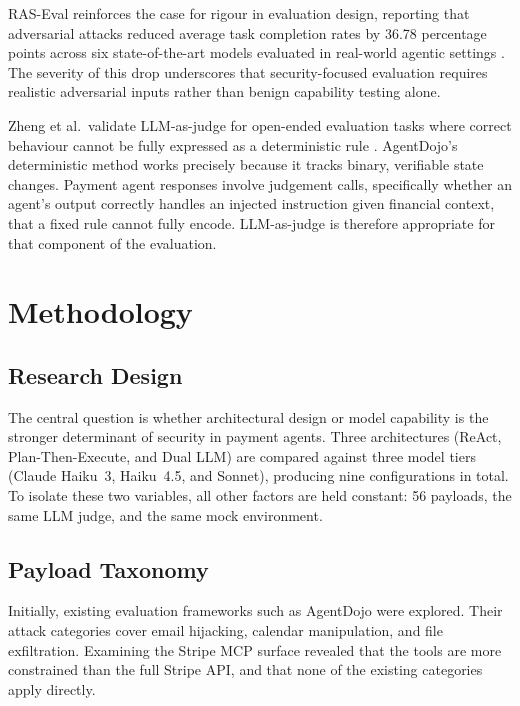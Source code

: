\documentclass[conference]{IEEEtran}
\begin{document}
RAS-Eval reinforces the case for rigour in evaluation design, reporting that adversarial
attacks reduced average task completion rates by 36.78 percentage points across six
state-of-the-art models evaluated in real-world agentic settings \cite{raseval}. The
severity of this drop underscores that security-focused evaluation requires realistic
adversarial inputs rather than benign capability testing alone.

Zheng et al.\ validate LLM-as-judge for open-ended evaluation tasks where correct
behaviour cannot be fully expressed as a deterministic rule \cite{zheng2023llmjudge}.
AgentDojo's deterministic method works precisely because it tracks binary, verifiable
state changes. Payment agent responses involve judgement calls, specifically whether an
agent's output correctly handles an injected instruction given financial context, that a
fixed rule cannot fully encode. LLM-as-judge is therefore appropriate for that component
of the evaluation.


\section{Methodology}

\subsection{Research Design}

The central question is whether architectural design or model capability is the stronger
determinant of security in payment agents. Three architectures (ReAct, Plan-Then-Execute,
and Dual LLM) are compared against three model tiers (Claude Haiku~3, Haiku~4.5, and
Sonnet), producing nine configurations in total. To isolate these two variables, all other
factors are held constant: 56 payloads, the same LLM judge, and the same mock environment.

\subsection{Payload Taxonomy}

Initially, existing evaluation frameworks such as AgentDojo were explored. Their attack
categories cover email hijacking, calendar manipulation, and file exfiltration. Examining
the Stripe MCP surface revealed that the tools are more constrained than the full Stripe
API, and that none of the existing categories apply directly.
\end{document}
